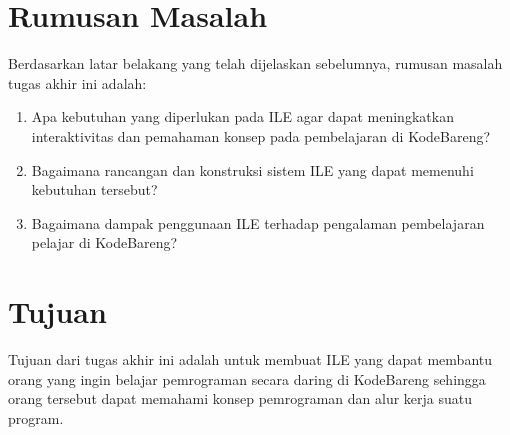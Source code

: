 

\section{Rumusan Masalah}
Berdasarkan latar belakang yang telah dijelaskan sebelumnya, rumusan masalah tugas akhir ini adalah:

\begin{enumerate}
      \item Apa kebutuhan yang diperlukan pada ILE agar dapat meningkatkan interaktivitas dan pemahaman konsep pada pembelajaran di KodeBareng?
      \item Bagaimana rancangan dan konstruksi sistem ILE yang dapat memenuhi kebutuhan tersebut?
      \item Bagaimana dampak penggunaan ILE terhadap pengalaman pembelajaran pelajar di KodeBareng?
\end{enumerate}

\section{Tujuan}
Tujuan dari tugas akhir ini adalah untuk membuat ILE yang dapat membantu orang yang ingin belajar pemrograman secara daring di KodeBareng sehingga orang tersebut dapat memahami konsep pemrograman dan alur kerja suatu program.

